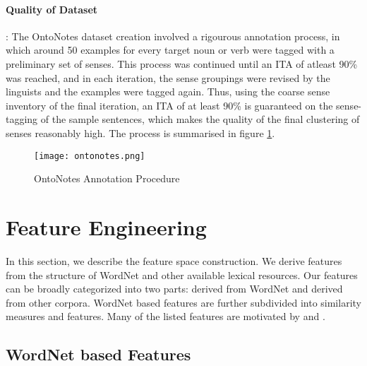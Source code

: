 \paragraph{Quality of Dataset}:
The OntoNotes dataset creation involved a rigourous annotation process, in which around 50 examples for every target noun or verb were tagged with a preliminary set of senses. This process was continued until an ITA of atleast 90\% was reached, and in each iteration, the sense groupings were revised by the linguists and the examples were tagged again. Thus, using the coarse sense inventory of the final iteration, an ITA of at least 90\% is guaranteed on the sense-tagging of the sample sentences, which makes the quality of the final clustering of senses reasonably high. The process is summarised in figure \ref{fig:ontonotes}.

\begin{figure}[h]
\begin{center}
\texttt{[image: ontonotes.png]}
\caption{OntoNotes Annotation Procedure \citep{Hovy:2006}}
\label{fig:ontonotes}
\end{center}
\end{figure}

\section{Feature Engineering}
\label{section:featureEngineering}
In this section, we describe the feature space construction. We derive features from the structure of WordNet and other available lexical resources. Our features can be broadly categorized into two parts: derived from WordNet and derived from other corpora.  WordNet based features are further subdivided into similarity measures and features. 
Many of the listed features are motivated by \citep{snow07mergesense} and \citep{Mihalcea01ez.wordnet:principles}.

\subsection{WordNet based Features}
